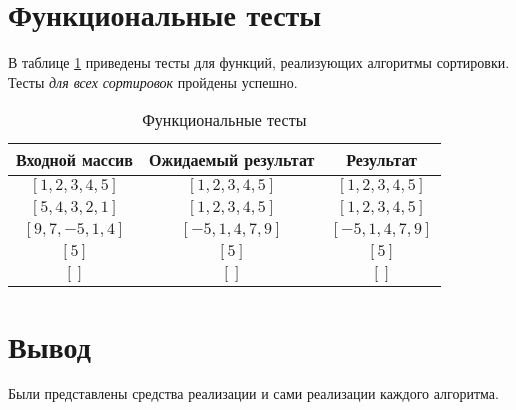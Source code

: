 \section{Функциональные тесты}

В таблице \ref{tbl:functional_test} приведены тесты для функций, реализующих алгоритмы сортировки. Тесты \textit{для всех сортировок} пройдены успешно.


\begin{table}[h]
	\begin{center}
		\begin{threeparttable}
		\captionsetup{singlelinecheck=off}
		\caption{\label{tbl:functional_test} Функциональные тесты}
		\begin{tabular}{|c|c|c|}
			\hline
			Входной массив & Ожидаемый результат & Результат \\ 
			\hline
			$[1, 2, 3, 4, 5]$ & $[1, 2, 3, 4, 5]$  & $[1, 2, 3, 4, 5]$\\
			\hline
			$[5, 4, 3, 2, 1]$  & $[1, 2, 3, 4, 5]$ & $[1, 2, 3, 4, 5]$\\
			\hline
			$[9, 7, -5, 1, 4]$  & $[-5, 1, 4, 7, 9]$  & $[-5, 1, 4, 7, 9]$\\
			\hline
			$[5]$  & $[5]$  & $[5]$\\
			\hline
			$[]$  & $[]$  & $[]$\\
			\hline
		\end{tabular}
    \end{threeparttable}
	\end{center}
\end{table}


\section*{Вывод}

Были представлены средства реализации и сами реализации каждого алгоритма.

